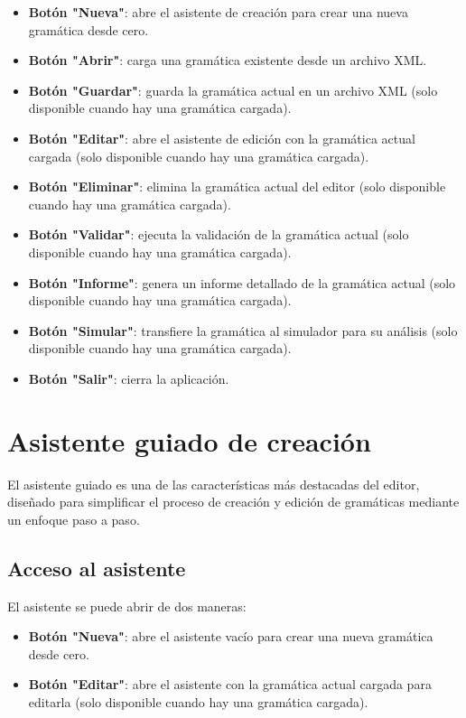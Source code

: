 \begin{itemize}
    \item \textbf{Botón \string"Nueva\string"}: abre el asistente de creación para crear una nueva gramática desde cero.
    \item \textbf{Botón \string"Abrir\string"}: carga una gramática existente desde un archivo XML.
    \item \textbf{Botón \string"Guardar\string"}: guarda la gramática actual en un archivo XML (solo disponible cuando hay una gramática cargada).
    \item \textbf{Botón \string"Editar\string"}: abre el asistente de edición con la gramática actual cargada (solo disponible cuando hay una gramática cargada).
    \item \textbf{Botón \string"Eliminar\string"}: elimina la gramática actual del editor (solo disponible cuando hay una gramática cargada).
    \item \textbf{Botón \string"Validar\string"}: ejecuta la validación de la gramática actual (solo disponible cuando hay una gramática cargada).
    \item \textbf{Botón \string"Informe\string"}: genera un informe detallado de la gramática actual (solo disponible cuando hay una gramática cargada).
    \item \textbf{Botón \string"Simular\string"}: transfiere la gramática al simulador para su análisis (solo disponible cuando hay una gramática cargada).
    \item \textbf{Botón \string"Salir\string"}: cierra la aplicación.
\end{itemize}

\section{Asistente guiado de creación}

El asistente guiado es una de las características más destacadas del editor, diseñado para simplificar el proceso de creación y edición de gramáticas mediante un enfoque paso a paso.

\subsection{Acceso al asistente}

El asistente se puede abrir de dos maneras:

\begin{itemize}
    \item \textbf{Botón \string"Nueva\string"}: abre el asistente vacío para crear una nueva gramática desde cero.
    \item \textbf{Botón \string"Editar\string"}: abre el asistente con la gramática actual cargada para editarla (solo disponible cuando hay una gramática cargada).
\end{itemize}

